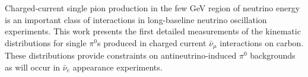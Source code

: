 Charged-current single pion production in the few GeV region of neutrino energy is an important 
class of interactions in long-baseline neutrino oscillation experiments.   This work presents 
the first detailed measurements of the kinematic distributions for single $\pi^0$s produced 
in charged current $\bar{\nu}_\mu$ interactions on carbon.  These distributions provide 
constraints on antineutrino-induced $\pi^0$ backgrounds as will occur in $\bar{\nu}_e$ appearance 
experiments.  

